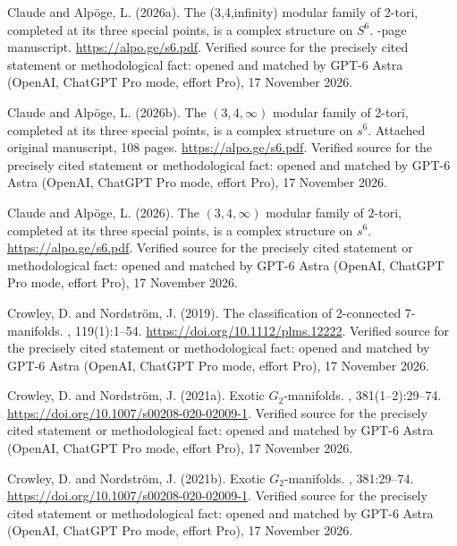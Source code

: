 \begin{thebibliography}{}
{Claude} and Alp{\"o}ge, L. (2026a).
\newblock The (3,4,infinity) modular family of 2-tori, completed at its three
  special points, is a complex structure on {$S^6$}.
-page manuscript.
\newblock \url{https://alpo.ge/s6.pdf}. Verified source for the precisely cited statement or methodological fact: opened and matched by GPT-6 Astra (OpenAI, ChatGPT Pro mode, effort Pro), 17 November 2026.

{Claude} and Alp{\"o}ge, L. (2026b).
\newblock The $(3,4,\infty)$ modular family of 2-tori, completed at its three
  special points, is a complex structure on $s^6$.
\newblock Attached original manuscript, 108 pages.
\newblock \url{https://alpo.ge/s6.pdf}. Verified source for the precisely cited statement or methodological fact: opened and matched by GPT-6 Astra (OpenAI, ChatGPT Pro mode, effort Pro), 17 November 2026.

Claude and Alp{\"o}ge, L. (2026).
\newblock The $(3,4,\infty)$ modular family of $2$-tori, completed at its three
  special points, is a complex structure on $s^6$.
\newblock \url{https://alpo.ge/s6.pdf}. Verified source for the precisely cited statement or methodological fact: opened and matched by GPT-6 Astra (OpenAI, ChatGPT Pro mode, effort Pro), 17 November 2026.

Crowley, D. and Nordstr{\"o}m, J. (2019).
\newblock The classification of 2-connected 7-manifolds.
, 119(1):1--54.
\newblock \url{https://doi.org/10.1112/plms.12222}. Verified source for the precisely cited statement or methodological fact: opened and matched by GPT-6 Astra (OpenAI, ChatGPT Pro mode, effort Pro), 17 November 2026.

Crowley, D. and Nordstr{\"o}m, J. (2021a).
\newblock Exotic {$G_2$}-manifolds.
, 381(1--2):29--74.
\newblock \url{https://doi.org/10.1007/s00208-020-02009-1}. Verified source for the precisely cited statement or methodological fact: opened and matched by GPT-6 Astra (OpenAI, ChatGPT Pro mode, effort Pro), 17 November 2026.

Crowley, D. and Nordstr{\"o}m, J. (2021b).
\newblock Exotic {$G_2$}-manifolds.
, 381:29--74.
\newblock \url{https://doi.org/10.1007/s00208-020-02009-1}. Verified source for the precisely cited statement or methodological fact: opened and matched by GPT-6 Astra (OpenAI, ChatGPT Pro mode, effort Pro), 17 November 2026.


\end{thebibliography}
